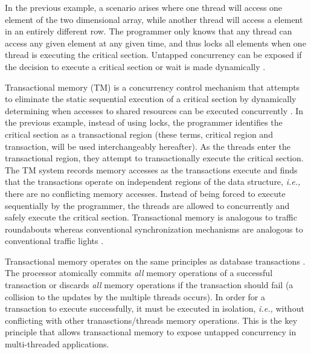 \documentclass[11pt]{book}
\begin{document}
In the previous example, a scenario arises where one thread will access one
element of the two dimensional array, while another thread will access a element
in an entirely different row.  The programmer only knows that any thread can
access any given element at any given time, and thus locks all elements when one
thread is executing the critical section. Untapped concurrency can be exposed if
the decision to execute a critical section or wait is made dynamically
\cite{intel_prog_ref}.  

Transactional memory (TM) is a concurrency control mechanism that attempts to eliminate
the static sequential execution of a critical section by dynamically determining when
accesses to shared resources can be executed concurrently \cite{sle_rajwar}.  In the previous
example, instead of using locks, the programmer identifies the critical section as a
transactional region (these terms, critical region and transaction, will be used
interchangeably hereafter).  As the threads enter the transactional region, they attempt
to transactionally execute the critical section.  The TM system records memory accesses
as the transactions execute and finds that the transactions operate on independent regions
of the data structure, \emph{i.e.,} there are no conflicting memory accesses.  Instead of
being forced to execute sequentially by the programmer, the threads are allowed to
concurrently and safely execute the critical section.  Transactional memory is analogous
to traffic roundabouts whereas conventional synchronization mechanisms are analogous to
conventional traffic lights \cite{neuling_vid}.

Transactional memory operates on the same principles as database transactions
\cite{tm_2nd}.  The processor atomically commits \emph{all} memory operations of a
successful transaction or discards \emph{all} memory operations if the transaction should
fail (a collision to the updates by the multiple threads occurs).  In order for a
transaction to execute successfully, it must be executed in isolation, \emph{i.e.,}
without conflicting with other tranasctions/threads memory operations.  This is the key
principle that allows transactional memory to expose untapped concurrency in
multi-threaded applications.
\end{document}
